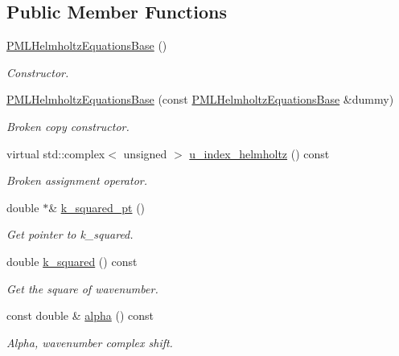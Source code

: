 \subsection*{Public Member Functions}
\begin{DoxyCompactItemize}
\item 
\hyperlink{classoomph_1_1PMLHelmholtzEquationsBase_ac63587d3e479d38377e5330095f110b6}{P\+M\+L\+Helmholtz\+Equations\+Base} ()
\begin{DoxyCompactList}\small\item\em Constructor. \end{DoxyCompactList}\item 
\hyperlink{classoomph_1_1PMLHelmholtzEquationsBase_a13f521613ce7762c287091c53d9ae953}{P\+M\+L\+Helmholtz\+Equations\+Base} (const \hyperlink{classoomph_1_1PMLHelmholtzEquationsBase}{P\+M\+L\+Helmholtz\+Equations\+Base} \&dummy)
\begin{DoxyCompactList}\small\item\em Broken copy constructor. \end{DoxyCompactList}\item 
virtual std\+::complex$<$ unsigned $>$ \hyperlink{classoomph_1_1PMLHelmholtzEquationsBase_aecebb06e1f97f8ad44caa265c4bfd6eb}{u\+\_\+index\+\_\+helmholtz} () const
\begin{DoxyCompactList}\small\item\em Broken assignment operator. \end{DoxyCompactList}\item 
double $\ast$\& \hyperlink{classoomph_1_1PMLHelmholtzEquationsBase_a4bf59f545ac99cdf9e44f6cb365de08a}{k\+\_\+squared\+\_\+pt} ()
\begin{DoxyCompactList}\small\item\em Get pointer to k\+\_\+squared. \end{DoxyCompactList}\item 
double \hyperlink{classoomph_1_1PMLHelmholtzEquationsBase_a1028cc3fdde3e57ffdfac5cba8893418}{k\+\_\+squared} () const
\begin{DoxyCompactList}\small\item\em Get the square of wavenumber. \end{DoxyCompactList}\item 
const double \& \hyperlink{classoomph_1_1PMLHelmholtzEquationsBase_a1d829e0491550007a0474c639dea34ba}{alpha} () const
\begin{DoxyCompactList}\small\item\em Alpha, wavenumber complex shift. \end{DoxyCompactList}\item 

\end{DoxyCompactItemize}
